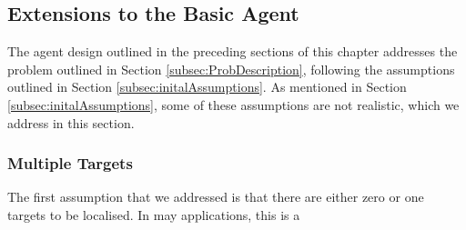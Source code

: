 \subsection{Extensions to the Basic Agent}
The agent design outlined in the preceding sections of this chapter addresses the problem outlined in Section \ref{subsec:ProbDescription},  following the assumptions outlined in Section \ref{subsec:initalAssumptions}. As mentioned in Section \ref{subsec:initalAssumptions}, some of these assumptions are not realistic, which we address in this section. \par

\subsubsection{Multiple Targets}
The first assumption that we addressed is that there are either zero or one targets to be localised. In may applications, this is a 
